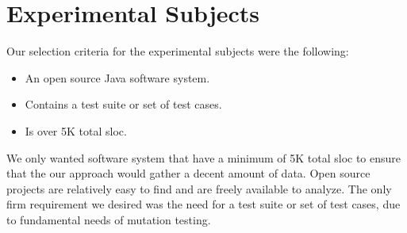 \section{Experimental Subjects}
\label{sec:experiment_subjects}
Our selection criteria for the experimental subjects were the following:

\begin{itemize}
  \item An open source Java software system.
  \item Contains a test suite or set of test cases.
  \item Is over 5K total \gls{sloc}.
\end{itemize}

We only wanted software system that have a minimum of 5K total \gls{sloc} to ensure that the our approach would gather a decent amount of data. Open source projects are relatively easy to find and are freely available to analyze. The only firm requirement we desired was the need for a test suite or set of test cases, due to fundamental needs of mutation testing.

